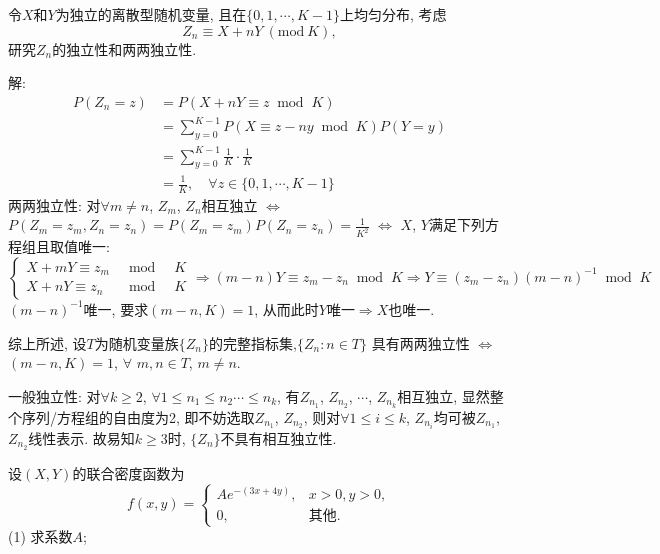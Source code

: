\documentclass[standard]{ExBook}
\renewenvironment{shaded}{%
  \def\FrameCommand{\fboxsep=\FrameSep \colorbox{shadecolor}}%
  \MakeFramed{\advance\hsize-\width \FrameRestore}%
}{%
  \endMakeFramed
}
\begin{document}
\begin{qitems}
\vspace{2.5cm-5em}

    \begin{bbox}
    \begin{shaded}
        \qitem
令$X$和$Y$为独立的离散型随机变量, 且在$\{0,1,\cdots,K-1\}$上均匀分布, 考虑
$$Z_n \equiv X+nY\ (\text{mod}\ K),$$
研究$Z_n$的独立性和两两独立性.
    \end{shaded}
    \end{bbox}

\vspace{\dimexpr2.5cm-5em\relax}

解:
$$
\begin{aligned}
P(Z_n=z)
&=P(X+nY\equiv z\;\;\text{mod}\;\;K)\\
&=\sum\limits_{y=0}^{K-1}P(X\equiv z-ny\;\;\text{mod}\;\;K)P(Y=y)\\
&=\sum\limits_{y=0}^{K-1}\frac{1}{K}\cdot\frac{1}{K}\\
&=\frac{1}{K},\quad\forall z\in\{0,1,\cdots,K-1\}
\end{aligned}$$
两两独立性: 对$\forall m\neq n$, $Z_m$, $Z_n$相互独立 $\Longleftrightarrow$ $P(Z_m=z_m,Z_n=z_n)=P(Z_m=z_m)P(Z_n=z_n)=\displaystyle\frac{1}{K^2}$ $\Longleftrightarrow$ $X$, $Y$满足下列方程组且取值唯一:
$$
    \left\{
    \begin{array}{lll}
        X+mY\equiv z_m\;\;&\text{mod}\;\;&K\\
        X+nY\equiv z_n\;\;&\text{mod}\;\;&K
    \end{array}
    \right.
    \Longrightarrow
    (m-n)Y\equiv z_m-z_n\;\;\text{mod}\;\;K
    \Longrightarrow
    Y\equiv (z_m-z_n)(m-n)^{-1}\;\;\text{mod}\;\;K
$$
$(m-n)^{-1}$唯一, 要求$(m-n,K)=1$, 从而此时$Y$唯一$\Longrightarrow$$X$也唯一.

综上所述, 设$T$为随机变量族$\{Z_n\}$的完整指标集,$\{Z_n:n\in T\}$ 具有两两独立性 $\Longleftrightarrow$ $(m-n,K)=1$, $\forall$ $m,n\in T$, $m\neq n$.

一般独立性: 对$\forall k\geq2$, $\forall 1\leq n_1\leq n_2\cdots\leq n_k$, 有$Z_{n_1}$, $Z_{n_2}$, $\cdots$, $Z_{n_k}$相互独立, 显然整个序列/方程组的自由度为2, 即不妨选取$Z_{n_1}$, $Z_{n_2}$, 则对$\forall 1\leq i\leq k$, $Z_{n_i}$均可被$Z_{n_1}$, $Z_{n_2}$线性表示. 故易知$k\geq3$时, $\{Z_{n}\}$不具有相互独立性.

\vspace{2.5cm-5em}

    \begin{bbox}
    \begin{shaded}
        \qitem
设$(X,Y)$的联合密度函数为
$$
    f(x,y)=
    \left\{
    \begin{array}{ll}
        A e^{-(3x+4y)}, &x>0,y>0,\\
        0, & \text{其他}.
    \end{array}
    \right.
$$
(1) 求系数$A$;


\end{shaded}
\end{bbox}
\end{qitems}
\end{document}

